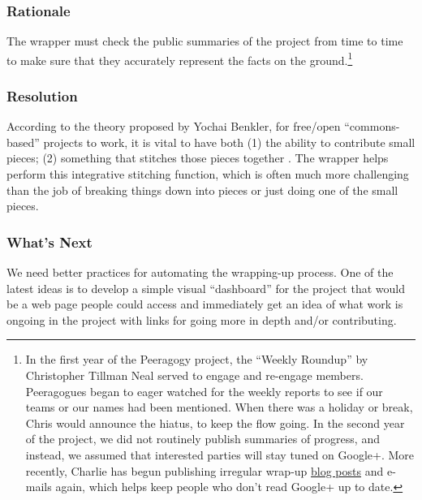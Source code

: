 \subsubsection*{Rationale}
The wrapper must check the public summaries of the project from time to time to make sure that they accurately represent the facts on the ground.\footnote{In the first year of the Peeragogy project, the ``Weekly Roundup'' by Christopher Tillman Neal served to engage and re-engage members. Peeragogues began to eager watched for the weekly reports to see if our teams or our names had been mentioned. When there was a holiday or break, Chris would announce the hiatus, to keep the flow going. In the second year of the project, we did not routinely publish summaries of progress, and instead, we assumed that interested parties will stay tuned on Google+.  More recently, Charlie has begun publishing irregular wrap-up \href{http://peeragogy.org/peeragogy-wrapper-post-9-feb-5-apr-2015/}{blog posts} and e-mails again, which helps keep people who don't read Google+ up to date.}

\subsubsection*{Resolution} 
According to the theory proposed by Yochai Benkler, for free/open ``commons-based'' projects to work, it is vital to have both (1) the ability to contribute small pieces; (2) something that stitches those pieces together \cite{coases-penguin}. The wrapper helps perform this integrative stitching function, which is often much more challenging than the job of breaking things down into pieces or just doing one of the small pieces.

\subsubsection*{What's Next}
We need better practices for automating the wrapping-up process. One of the latest ideas is to develop a simple visual ``dashboard'' for the project that would be a web page people could access and immediately get an idea of what work is ongoing in the project with links for going more in depth and/or contributing.
